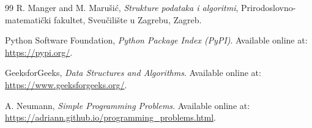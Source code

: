 \documentclass[b5paper, utf8, 11pt, colorlinks]{book}
\begin{document}
\begin{thebibliography}{99}
	R. Manger and M. Marušić,
	\textit{Strukture podataka i algoritmi},
	Prirodoslovno-matematički fakultet,
	Sveučilište u Zagrebu, Zagreb.
	
	
	Python Software Foundation,
	\textit{Python Package Index (PyPI)}.
	Available online at:
	\url{https://pypi.org/}.
	
	GeeksforGeeks,
	\textit{Data Structures and Algorithms}.
	Available online at:
	\url{https://www.geeksforgeeks.org/}.
	
	A. Neumann,
	\textit{Simple Programming Problems}.
	Available online at:
	\url{https://adriann.github.io/programming_problems.html}.
	
\end{thebibliography}
\end{document}
